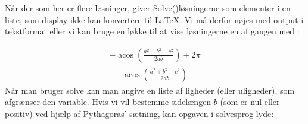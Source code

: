 \documentclass[letterpaper,10pt,english]{jupyterBook}
\begin{document}
\begin{sphinxVerbatim}[commandchars=\\\{\}]
 
\end{sphinxVerbatim}

\begin{sphinxVerbatim}
\end{sphinxVerbatim}

Når der som her er flere løsninger, giver Solve()løsningerne som elementer i en liste, som display ikke kan konvertere til LaTeX. Vi må derfor nøjes med output i tekstformat eller vi kan bruge en løkke til at vise løsningerne en af gangen med :

\begin{sphinxVerbatim}[commandchars=\\\{\}]
   
           
       
\end{sphinxVerbatim}

\begin{sphinxVerbatim}
\end{sphinxVerbatim}
\begin{equation*}
\begin{split}\displaystyle - \operatorname{acos}{\left(\frac{a^{2} + b^{2} - c^{2}}{2 a b} \right)} + 2 \pi\end{split}
\end{equation*}\begin{equation*}
\begin{split}\displaystyle \operatorname{acos}{\left(\frac{a^{2} + b^{2} - c^{2}}{2 a b} \right)}\end{split}
\end{equation*}
Når man bruger solve kan man angive en liste af ligheder (eller uligheder), som afgrænser den variable. Hvis vi vil bestemme sidelængen \(b\) (som er nul eller positiv) ved hjælp af Pythagoras’ sætning, kan opgaven i solve\sphinxhyphen{}sprog lyde:
\end{document}
